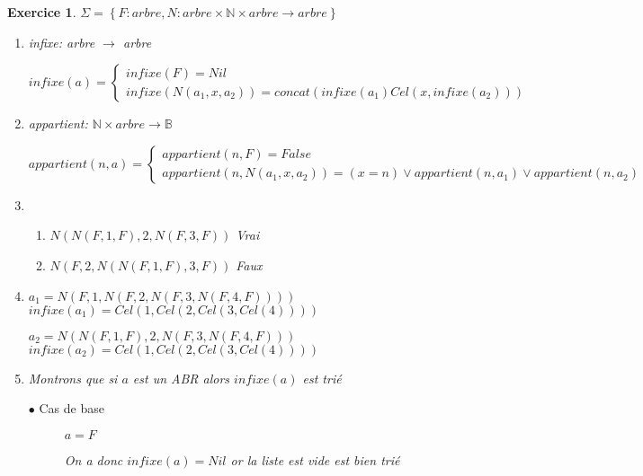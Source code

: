 \documentclass{article}
\theoremstyle{plain}
\newtheorem{exo}{Exercice}%
\begin{document}
\begin{exo} $\Sigma = \left\{F: arbre, N: arbre \times \mathbb{N} 
                \times arbre \rightarrow arbre \right\}$

\begin{enumerate}
    \item infixe: arbre $\rightarrow$ arbre 
    
        \[ infixe(a) =
        \begin{cases}
            infixe(F) = Nil \\
            infixe(N(a_1, x, a_2)) = concat(infixe(a_1) Cel(x, infixe(a_2)))
        \end{cases}
        \]

    \item appartient: $\mathbb{N} \times arbre \rightarrow \mathbb{B}$
    
        \[ appartient(n, a) =
        \begin{cases}
            appartient(n, F) = False \\
            appartient(n, N(a_1, x, a_2)) = (x = n) \vee appartient(n, a_1) 
                                                \vee appartient(n, a_2)
        \end{cases}
        \]

    \item 
    \begin{enumerate}
        \item $N(N(F,1,F),2,N(F,3,F))$ Vrai
        \item $N(F,2,N(N(F,1,F),3,F))$ Faux
    \end{enumerate}

    \item $a_1=N(F,1,N(F,2,N(F,3,N(F,4,F))))$  \hspace{0.5cm}
            $infixe(a_1) = Cel(1, Cel(2, Cel(3, Cel(4))))$

        $a_2=N(N(F,1,F),2,N(F,3,N(F,4,F)))$  \hspace{0.5cm}
            $infixe(a_2) = Cel(1, Cel(2, Cel(3, Cel(4))))$

    \item Montrons que si $a$ est un ABR alors $infixe(a)$ est trié
    
    \begin{description}
        \item[$\bullet$ Cas de base] $a=F$
        
            On a donc $infixe(a) = Nil$ or la liste est vide est bien trié
            

\end{description}
\end{enumerate}
\end{exo}
\end{document}
